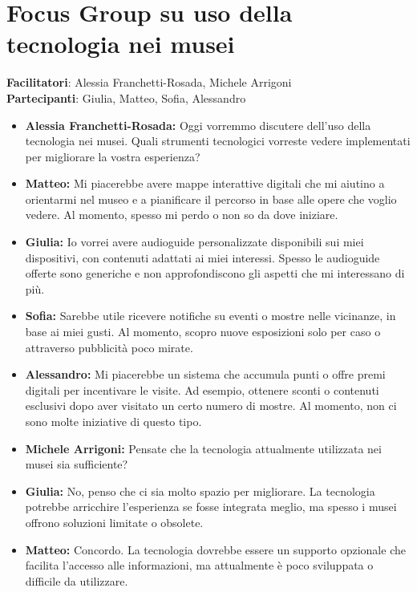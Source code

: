 \documentclass{article}
\begin{document}
\section{Focus Group su uso della tecnologia nei musei}
\textbf{Facilitatori}: Alessia Franchetti-Rosada, Michele Arrigoni \\
\textbf{Partecipanti}: Giulia, Matteo, Sofia, Alessandro

\begin{itemize}
    \item \textbf{Alessia Franchetti-Rosada:} Oggi vorremmo discutere dell’uso della tecnologia nei musei. Quali strumenti tecnologici vorreste vedere implementati per migliorare la vostra esperienza?
    
    \item \textbf{Matteo:} Mi piacerebbe avere mappe interattive digitali che mi aiutino a orientarmi nel museo e a pianificare il percorso in base alle opere che voglio vedere. Al momento, spesso mi perdo o non so da dove iniziare.
    
    \item \textbf{Giulia:} Io vorrei avere audioguide personalizzate disponibili sui miei dispositivi, con contenuti adattati ai miei interessi. Spesso le audioguide offerte sono generiche e non approfondiscono gli aspetti che mi interessano di più.
    
    \item \textbf{Sofia:} Sarebbe utile ricevere notifiche su eventi o mostre nelle vicinanze, in base ai miei gusti. Al momento, scopro nuove esposizioni solo per caso o attraverso pubblicità poco mirate.
    
    \item \textbf{Alessandro:} Mi piacerebbe un sistema che accumula punti o offre premi digitali per incentivare le visite. Ad esempio, ottenere sconti o contenuti esclusivi dopo aver visitato un certo numero di mostre. Al momento, non ci sono molte iniziative di questo tipo.
    
    \item \textbf{Michele Arrigoni:} Pensate che la tecnologia attualmente utilizzata nei musei sia sufficiente?
    
    \item \textbf{Giulia:} No, penso che ci sia molto spazio per migliorare. La tecnologia potrebbe arricchire l’esperienza se fosse integrata meglio, ma spesso i musei offrono soluzioni limitate o obsolete.
    
    \item \textbf{Matteo:} Concordo. La tecnologia dovrebbe essere un supporto opzionale che facilita l’accesso alle informazioni, ma attualmente è poco sviluppata o difficile da utilizzare.
    

\end{itemize}
\end{document}
